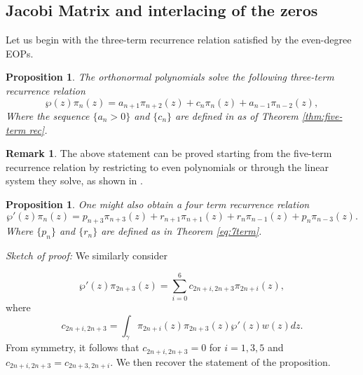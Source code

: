 \documentclass[11pt,a4paper]{article}
\newtheorem{proposition}[theorem]{Proposition}
\theoremstyle{definition}
\newtheorem{remark}[theorem]{Remark}
\numberwithin{equation}{section}
\numberwithin{theorem}{section}
\begin{document}
\subsection{Jacobi Matrix and interlacing of the zeros}\label{subsec: Jacobi-even}
Let us begin with the three-term recurrence relation satisfied by the even-degree EOPs.
\begin{proposition}\label{prop:3t}
The orthonormal polynomials solve the following three-term recurrence relation
    \begin{equation}\label{3term2}
     \wp(z)\pi_{n}(z)=a_{n+1}\pi_{n+2}(z)+c_{n}\pi_{n}(z)+a_{n-1}\pi_{n-2}(z),
     \end{equation}
     Where the sequence $\{a_n>0\}$ and $\{c_n\}$ are defined in as of Theorem \ref{thm:five-term rec}.
\end{proposition}
\begin{remark}
The above statement can be proved starting from the five-term recurrence relation by restricting to even polynomials or through the linear system they solve, as shown in \cite{DLR24}.
\end{remark}

\begin{proposition}\label{prop:4t}
One might also obtain a four term recurrence relation
    \begin{equation}
\wp'(z)\pi_{n}(z)=p_{n+3}\pi_{n+3}(z)+r_{n+1}\pi_{n+1}(z)+r_{n}\pi_{n-1}(z)+p_{n}\pi_{n-3}(z).
\end{equation}
Where $\{p_n\}$ and $ \{r_n\}$ are defined as in Theorem \ref{eq:7term}.
\end{proposition}

\noindent
{\it Sketch of proof:} We similarly consider 

    \begin{equation}
        \wp'(z)\pi_{2n+3}(z)=\sum_{i=0}^{6}c_{2n+i,2n+3}\pi_{2n+i}(z),
    \end{equation}
where $$c_{2n+i,2n+3}=\int_{\gamma}\pi_{2n+i}(z)\pi_{2n+3}(z)\wp'(z)w(z)dz.$$ From symmetry, it follows that $c_{2n+i,2n+3}=0$ for $i=1,3,5$ and  $c_{2n+i,2n+3}=c_{2n+3,2n+i}$. We then recover the statement of the proposition.


\end{document}
